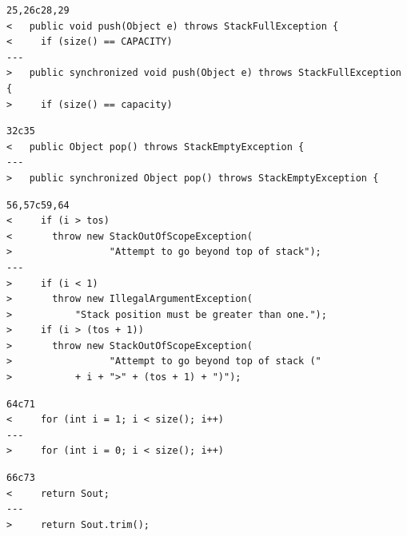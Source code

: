 \documentclass [12pt, a4paper, twoside, titlepage] {article}
\begin{document}
\begin{lstlisting}
25,26c28,29
<   public void push(Object e) throws StackFullException {
<     if (size() == CAPACITY)
---
>   public synchronized void push(Object e) throws StackFullException {
>     if (size() == capacity)
\end{lstlisting}


\begin{lstlisting}
32c35
<   public Object pop() throws StackEmptyException {
---
>   public synchronized Object pop() throws StackEmptyException {
\end{lstlisting}

\begin{lstlisting}
56,57c59,64
<     if (i > tos)
<       throw new StackOutOfScopeException(
>                 "Attempt to go beyond top of stack");
---
>     if (i < 1)
>       throw new IllegalArgumentException(
>           "Stack position must be greater than one.");
>     if (i > (tos + 1))
>       throw new StackOutOfScopeException(
>                 "Attempt to go beyond top of stack ("
>           + i + ">" + (tos + 1) + ")");
\end{lstlisting}

\begin{lstlisting}
64c71
<     for (int i = 1; i < size(); i++)
---
>     for (int i = 0; i < size(); i++)
\end{lstlisting}

\begin{lstlisting}
66c73
<     return Sout;
---
>     return Sout.trim();
\end{lstlisting}
\end{document}
